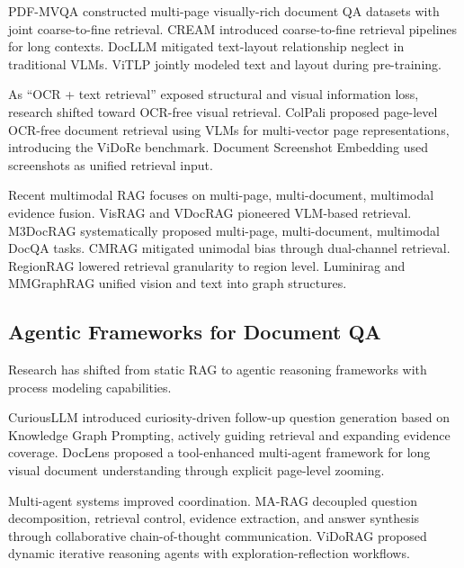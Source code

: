 PDF-MVQA \cite{ding2024mvqa} constructed multi-page visually-rich document QA datasets with joint coarse-to-fine retrieval. CREAM \cite{zhang2024cream} introduced coarse-to-fine retrieval pipelines for long contexts. DocLLM \cite{wang2024docllm} mitigated text-layout relationship neglect in traditional VLMs. ViTLP \cite{mao2024visually} jointly modeled text and layout during pre-training.

As ``OCR + text retrieval'' exposed structural and visual information loss, research shifted toward OCR-free visual retrieval. ColPali \cite{faysse2024colpali} proposed page-level OCR-free document retrieval using VLMs for multi-vector page representations, introducing the ViDoRe benchmark. Document Screenshot Embedding \cite{ma2024unifying} used screenshots as unified retrieval input.

Recent multimodal RAG focuses on multi-page, multi-document, multimodal evidence fusion. VisRAG \cite{yu2024visrag} and VDocRAG \cite{tanaka2025vdocrag} pioneered VLM-based retrieval. M3DocRAG \cite{cho2024m3docrag} systematically proposed multi-page, multi-document, multimodal DocQA tasks. CMRAG \cite{chen2025cmrag} mitigated unimodal bias through dual-channel retrieval. RegionRAG \cite{li2025regionrag} lowered retrieval granularity to region level. Luminirag \cite{martis2024luminirag} and MMGraphRAG \cite{wan2025mmgraphrag} unified vision and text into graph structures.

\subsection{Agentic Frameworks for Document QA}

Research has shifted from static RAG to agentic reasoning frameworks with process modeling capabilities.

CuriousLLM \cite{yang2025curiousllm} introduced curiosity-driven follow-up question generation based on Knowledge Graph Prompting, actively guiding retrieval and expanding evidence coverage. DocLens \cite{zhu2025doclens} proposed a tool-enhanced multi-agent framework for long visual document understanding through explicit page-level zooming.

Multi-agent systems improved coordination. MA-RAG \cite{nguyen2025ma} decoupled question decomposition, retrieval control, evidence extraction, and answer synthesis through collaborative chain-of-thought communication. ViDoRAG \cite{wang2025vidorag} proposed dynamic iterative reasoning agents with exploration-reflection workflows.

